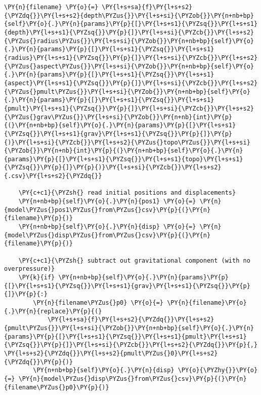 \begin{tcolorbox}[breakable, size=fbox, boxrule=1pt, pad at break*=1mm,colback=cellbackground, colframe=cellborder]
\begin{Verbatim}[commandchars=\\\{\}]
    \PY{n}{filename} \PY{o}{=} \PY{l+s+sa}{f}\PY{l+s+s2}{\PYZdq{}}\PY{l+s+s2}{depth\PYZus{}}\PY{l+s+si}{\PYZob{}}\PY{n+nb+bp}{self}\PY{o}{.}\PY{n}{params}\PY{p}{[}\PY{l+s+s1}{\PYZsq{}}\PY{l+s+s1}{depth}\PY{l+s+s1}{\PYZsq{}}\PY{p}{]}\PY{l+s+si}{\PYZcb{}}\PY{l+s+s2}{\PYZus{}radius\PYZus{}}\PY{l+s+si}{\PYZob{}}\PY{n+nb+bp}{self}\PY{o}{.}\PY{n}{params}\PY{p}{[}\PY{l+s+s1}{\PYZsq{}}\PY{l+s+s1}{radius}\PY{l+s+s1}{\PYZsq{}}\PY{p}{]}\PY{l+s+si}{\PYZcb{}}\PY{l+s+s2}{\PYZus{}aspect\PYZus{}}\PY{l+s+si}{\PYZob{}}\PY{n+nb+bp}{self}\PY{o}{.}\PY{n}{params}\PY{p}{[}\PY{l+s+s1}{\PYZsq{}}\PY{l+s+s1}{aspect}\PY{l+s+s1}{\PYZsq{}}\PY{p}{]}\PY{l+s+si}{\PYZcb{}}\PY{l+s+s2}{\PYZus{}pmult\PYZus{}}\PY{l+s+si}{\PYZob{}}\PY{n+nb+bp}{self}\PY{o}{.}\PY{n}{params}\PY{p}{[}\PY{l+s+s1}{\PYZsq{}}\PY{l+s+s1}{pmult}\PY{l+s+s1}{\PYZsq{}}\PY{p}{]}\PY{l+s+si}{\PYZcb{}}\PY{l+s+s2}{\PYZus{}grav\PYZus{}}\PY{l+s+si}{\PYZob{}}\PY{n+nb}{int}\PY{p}{(}\PY{n+nb+bp}{self}\PY{o}{.}\PY{n}{params}\PY{p}{[}\PY{l+s+s1}{\PYZsq{}}\PY{l+s+s1}{grav}\PY{l+s+s1}{\PYZsq{}}\PY{p}{]}\PY{p}{)}\PY{l+s+si}{\PYZcb{}}\PY{l+s+s2}{\PYZus{}topo\PYZus{}}\PY{l+s+si}{\PYZob{}}\PY{n+nb}{int}\PY{p}{(}\PY{n+nb+bp}{self}\PY{o}{.}\PY{n}{params}\PY{p}{[}\PY{l+s+s1}{\PYZsq{}}\PY{l+s+s1}{topo}\PY{l+s+s1}{\PYZsq{}}\PY{p}{]}\PY{p}{)}\PY{l+s+si}{\PYZcb{}}\PY{l+s+s2}{.csv}\PY{l+s+s2}{\PYZdq{}}

    \PY{c+c1}{\PYZsh{} read initial positions and displacements}
    \PY{n+nb+bp}{self}\PY{o}{.}\PY{n}{pos1} \PY{o}{=} \PY{n}{model\PYZus{}pos1\PYZus{}from\PYZus{}csv}\PY{p}{(}\PY{n}{filename}\PY{p}{)}
    \PY{n+nb+bp}{self}\PY{o}{.}\PY{n}{disp} \PY{o}{=} \PY{n}{model\PYZus{}disp\PYZus{}from\PYZus{}csv}\PY{p}{(}\PY{n}{filename}\PY{p}{)}

    \PY{c+c1}{\PYZsh{} subtract out gravitational component (with no overpressure)}
    \PY{k}{if} \PY{n+nb+bp}{self}\PY{o}{.}\PY{n}{params}\PY{p}{[}\PY{l+s+s1}{\PYZsq{}}\PY{l+s+s1}{grav}\PY{l+s+s1}{\PYZsq{}}\PY{p}{]}\PY{p}{:}
        \PY{n}{filename\PYZus{}p0} \PY{o}{=} \PY{n}{filename}\PY{o}{.}\PY{n}{replace}\PY{p}{(}
            \PY{l+s+sa}{f}\PY{l+s+s2}{\PYZdq{}}\PY{l+s+s2}{pmult\PYZus{}}\PY{l+s+si}{\PYZob{}}\PY{n+nb+bp}{self}\PY{o}{.}\PY{n}{params}\PY{p}{[}\PY{l+s+s1}{\PYZsq{}}\PY{l+s+s1}{pmult}\PY{l+s+s1}{\PYZsq{}}\PY{p}{]}\PY{l+s+si}{\PYZcb{}}\PY{l+s+s2}{\PYZdq{}}\PY{p}{,} \PY{l+s+s2}{\PYZdq{}}\PY{l+s+s2}{pmult\PYZus{}0}\PY{l+s+s2}{\PYZdq{}}\PY{p}{)}
        \PY{n+nb+bp}{self}\PY{o}{.}\PY{n}{disp} \PY{o}{\PYZhy{}}\PY{o}{=} \PY{n}{model\PYZus{}disp\PYZus{}from\PYZus{}csv}\PY{p}{(}\PY{n}{filename\PYZus{}p0}\PY{p}{)}


\end{Verbatim}
\end{tcolorbox}

